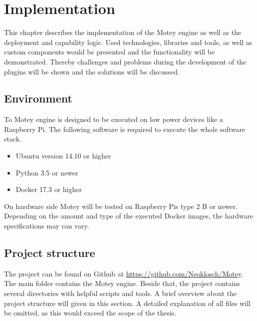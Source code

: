 \chapter{Implementation}
\label{chapter:implementation}
\minitoc\vspace{.5cm}
This chapter describes the implementation of the Motey engine as well as the deployment and capability logic.
Used technologies, libraries and tools, as well as custom components would be presented and the functionality will be demonstrated.
Thereby challenges and problems during the development of the plugins will be shown and the solutions will be discussed.

\section{Environment}
To Motey engine is designed to be executed on low power devices like a Raspberry Pi.
The following software is required to execute the whole software stack.
\begin{itemize}
  \item Ubuntu version 14.10 or higher
  \item Python 3.5 or newer
  \item Docker 17.3 or higher
\end{itemize}
On hardware side Motey will be tested on Raspberry Pis type 2 B or newer.
Depending on the amount and type of the executed Docker images, the hardware specifications may can vary.


\section{Project structure}
The project can be found on Github at \url{https://github.com/Neoklosch/Motey}.
The main folder contains the Motey engine.
Beside that, the project contains several directories with helpful scripts and tools.
A brief overview about the project structure will given in this section.
A detailed explanation of all files will be omitted, as this would exceed the scope of the thesis.

